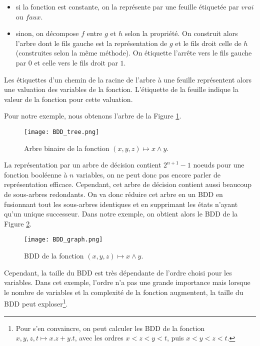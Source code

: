 \begin{itemize}
\item
  si la fonction est constante, on la représente par une feuille
  étiquetée par \(vrai\) ou \(faux\).
\item
  sinon, on décompose \(f\) entre \(g\) et \(h\) selon la propriété. On
  construit alors l'arbre dont le fils gauche est la représentation de
  \(g\) et le fils droit celle de \(h\) (construites selon la même méthode).
  On étiquette l'arrête vers le fils gauche par \(0\) et celle vers le fils
  droit par \(1\).
\end{itemize}

Les étiquettes d'un chemin de la racine de l'arbre à une feuille représentent
alors une valuation des variables de la fonction. L'étiquette de la feuille
indique la valeur de la fonction pour cette valuation.

Pour notre exemple, nous obtenons l'arbre de la Figure \ref{fig:BDD_tree}.

\begin{figure}[h!]
\begin{center}
  \texttt{[image: BDD\_tree.png]}
\end{center}
\caption{Arbre binaire de la fonction \((x,y,z) \mapsto x \land y\).}
\label{fig:BDD_tree}
\end{figure}

La représentation par un arbre de décision contient \(2^{n+1} - 1\) noeuds pour
une fonction booléenne à \(n\) variables, on ne peut donc pas encore parler de
représentation efficace. Cependant, cet arbre de décision contient aussi
beaucoup de sous-arbres redondants. On va donc réduire cet arbre en un BDD en
fusionnant tout les sous-arbres identiques et en supprimant les états n'ayant
qu'un unique successeur. Dans notre exemple, on obtient alors le BDD de la
Figure \ref{fig:BDD_graph}.

\begin{figure}[h]
\begin{center}
\texttt{[image: BDD\_graph.png]}
\end{center}
\caption{BDD de la fonction \((x,y,z) \mapsto x \land y\).}
\label{fig:BDD_graph}
\end{figure}

Cependant, la taille du BDD est très dépendante de l'ordre choisi pour
les variables\cite{OBDD}. Dans cet exemple, l'ordre n'a pas une grande importance
mais lorsque le nombre de variables et la complexité de la fonction
augmentent, la taille du BDD peut exploser\footnote{Pour s'en
  convaincre, on peut calculer les BDD de la fonction
  \(x, y, z, t \mapsto x.z + y.t\), avec les ordres \(x<z<y<t\), puis
  \(x<y<z<t\).}.

